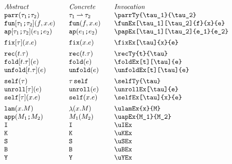 \documentclass[11pt]{article}
\begin{document}
\begin{figure}

  \begin{small}
    \begin{displaymath}
      \begin{array}{l@{\qquad}l@{\qquad}l@{\qquad}l}
        \textit{Abstract} & \textit{Concrete} & \textit{Invocation} \\
        \parrTy{\tau_1}{\tau_2}         & \parrTy*{\tau_1}{\tau_2} & \verb|\parrTy{\tau_1}{\tau_2}|          \\
        \funEx[\tau_1][\tau_2]{f}{x}{e} & \funEx*{f}{x}{e}         & \verb|\funEx[\tau_1][\tau_2]{f}{x}{e}|  \\
        \papEx[\tau_1][\tau_2]{e_1}{e_2} & \papEx*{e_1}{e_2}        & \verb|\papEx[\tau_1][\tau_2]{e_1}{e_2}| \\[1ex]

        \fixEx[\tau]{x}{e}              & \fixEx*[\tau]{x}{e}      & \verb|\fixEx[\tau]{x}{e}|               \\[1ex]

        \recTy{t}{\tau}                 & \recTy*{t}{\tau}         & \verb|\recTy{t}{\tau}|                  \\
        \foldEx[t][\tau]{e}             & \foldEx*{e}              & \verb|\foldEx[t][\tau]{e}|              \\
        \unfoldEx[t][\tau]{e}           & \unfoldEx*{e}            & \verb|\unfoldEx[t][\tau]{e}|            \\[1ex]

        \selfTy{\tau}                   & \selfTy*{\tau}           & \verb|\selfTy{\tau}|                    \\
        \unrollEx[\tau]{e}              & \unrollEx*{e}            & \verb|\unrollEx[\tau]{e}|               \\
        \selfEx[\tau]{x}{e}             & \selfEx*{x}{e}           & \verb|\selfEx[\tau]{x}{e}|              \\[1ex]

        \ulamEx{x}{M}                   & \ulamEx*{x}{M}           & \verb|\ulamEx{x}{M}|                    \\
        \uapEx{M_1}{M_2}                & \uapEx*{M_1}{M_2}        & \verb|\uapEx{M_1}{M_2}|                 \\
        \uIEx                           & \uIEx*                   & \verb|\uIEx|                            \\
        \uKEx                           & \uKEx*                   & \verb|\uKEx|                            \\
        \uSEx                           & \uSEx*                   & \verb|\uSEx|                            \\
        \uBEx                           & \uBEx*                   & \verb|\uBEx|                             \\
        \uYEx                           & \uYEx*                    & \verb|\uYEx|
      \end{array}
    \end{displaymath}
  \end{small}


\end{figure}
\end{document}
